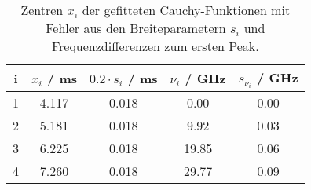 \begin{table}[H]
\caption{Zentren $x_i$ der gefitteten Cauchy-Funktionen mit Fehler aus den Breiteparametern $s_i$ und Frequenzdifferenzen zum ersten Peak. }
\begin{center}
\begin{tabular}{|c|c|c|c|c|}
  \hline
  i & $x_i$ / ms & $0.2 \cdot s_i$ / ms & $\nu_i$ / GHz & $s_{\nu_i}$ / GHz \\ \hline
  1 & 4.117 & 0.018 & 0.00 & 0.00 \\ \hline
  2 & 5.181 & 0.018 & 9.92 & 0.03 \\ \hline
  3 & 6.225 & 0.018 & 19.85 & 0.06 \\ \hline
  4 & 7.260 & 0.018 & 29.77 & 0.09 \\ \hline
\end{tabular}
\end{center}
\label{tab:etalon:calib:up}
\end{table}
